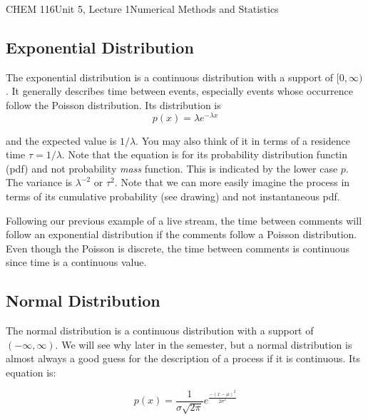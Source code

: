 \documentclass{article}
\begin{document}
\begin{tdoc}{CHEM 116}{Unit 5, Lecture 1}{Numerical Methods and Statistics}
\subsection{Exponential Distribution}
The exponential distribution is a continuous distribution with a
support of $[0,\infty)$. It generally describes time between events,
  especially events whose occurrence follow the Poisson distribution.
  Its distribution is
\begin{equation}
p(x) = \lambda e^{-\lambda x}
\end{equation}

and the expected value is $ 1 / \lambda$. You may also think of it in
terms of a residence time $\tau = 1 / \lambda$. Note that the equation is for its probability distribution functin (pdf) and not probability \textit{mass} function. This is indicated by the lower case $p$. The variance is
$\lambda^{-2}$ or $\tau^2$. Note that we can more easily imagine the process in
terms of its cumulative probability (see drawing) and not
instantaneous pdf.

Following our previous example of a live stream, the time between
comments will follow an exponential distribution if the comments
follow a Poisson distribution. Even though the Poisson is discrete,
the time between comments is continuous since time is a continuous
value.


\subsection{Normal Distribution}

The normal distribution is a continuous distribution with a support
of $(-\infty, \infty)$. We will see why later in the semester, but a
normal distribution is almost always a good guess for the
description of a process if it is continuous. Its equation is:

\begin{equation}
  p(x) = \frac{1}{\sigma\sqrt{2\pi}}e^{\frac{-(x - \mu)^2}{2\sigma ^2}}
\end{equation}

\end{tdoc}
\end{document}

